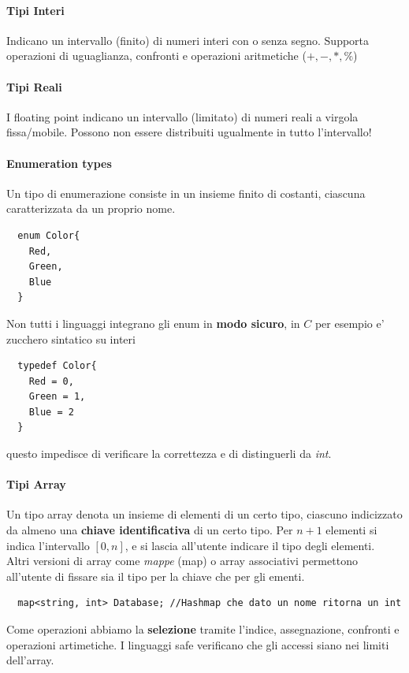 \documentclass[a4paper,12pt]{article}
\begin{document}
\paragraph{Tipi Interi}
Indicano un intervallo (finito) di numeri interi con o senza segno. Supporta operazioni di uguaglianza, confronti e operazioni aritmetiche ($+, -, *, \%$)
\paragraph{Tipi Reali}
I floating point indicano un intervallo (limitato) di numeri reali a virgola fissa/mobile. Possono non essere distribuiti ugualmente in tutto l'intervallo!
\paragraph{Enumeration types}
Un tipo di enumerazione consiste in un insieme finito di costanti, ciascuna caratterizzata da un
proprio nome.
\begin{lstlisting}
  enum Color{
    Red,
    Green,
    Blue
  }
\end{lstlisting}
Non tutti i linguaggi integrano gli enum in \textbf{modo sicuro}, in $C$ per esempio e' zucchero sintatico su interi
\begin{lstlisting}
  typedef Color{
    Red = 0,
    Green = 1,
    Blue = 2
  }
\end{lstlisting}
questo impedisce di verificare la correttezza e di distinguerli da \textit{int}.
\paragraph{Tipi Array}
Un tipo array denota un insieme di elementi di un certo tipo, ciascuno indicizzato da
almeno una \textbf{chiave identificativa} di un certo tipo. Per $n+1$ elementi si indica l'intervallo $[0, n]$, e si lascia all'utente indicare il tipo degli elementi.\\
Altri versioni di array come \textit{mappe} (map) o array associativi permettono all'utente di fissare sia il tipo per la chiave che per gli ementi.
\begin{lstlisting}
  map<string, int> Database; //Hashmap che dato un nome ritorna un int
\end{lstlisting}
Come operazioni abbiamo la \textbf{selezione} tramite l'indice, assegnazione, confronti e operazioni artimetiche. I linguaggi safe verificano che gli accessi siano nei limiti dell'array.
\end{document}
